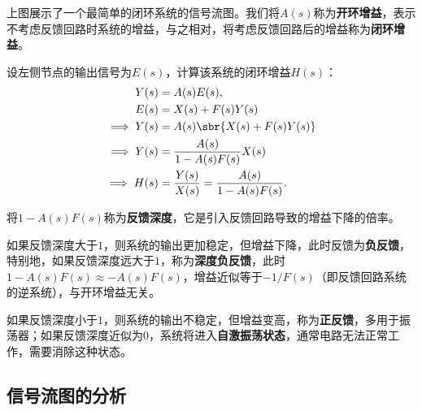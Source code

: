 上图展示了一个最简单的闭环系统的信号流图。我们将$A(s)$称为\textbf{开环增益}，表示不考虑反馈回路时系统的增益，与之相对，将考虑反馈回路后的增益称为\textbf{闭环增益}。

设左侧节点的输出信号为$E(s)$，计算该系统的闭环增益$H(s)$：
\begin{align}
    Y(s)&=A(s)E(s),\nonumber\\
    E(s)&=X(s)+F(s)Y(s)\nonumber\\
    \implies Y(s)&=A(s)\sbr{X(s)+F(s)Y(s)}\nonumber\\
    \implies Y(s)&=\frac{A(s)}{1-A(s)F(s)}X(s)\nonumber\\
    \implies H(s)&=\frac{Y(s)}{X(s)}=\frac{A(s)}{1-A(s)F(s)}.
\end{align}

\begin{definition}[反馈深度与反馈类型]
    将$1-A(s)F(s)$称为\textbf{反馈深度}，它是引入反馈回路导致的增益下降的倍率。

    如果反馈深度大于$1$，则系统的输出更加稳定，但增益下降，此时反馈为\textbf{负反馈}，特别地，如果反馈深度远大于$1$，称为\textbf{深度负反馈}，此时$1-A(s)F(s)\approx -A(s)F(s)$，增益近似等于$-1/F(s)$（即反馈回路系统的逆系统），与开环增益无关。

    如果反馈深度小于$1$，则系统的输出不稳定，但增益变高，称为\textbf{正反馈}，多用于振荡器；如果反馈深度近似为$0$，系统将进入\textbf{自激振荡状态}，通常电路无法正常工作，需要消除这种状态。
\end{definition}

\subsection{信号流图的分析}\label{sub:signal_flow_graph}

